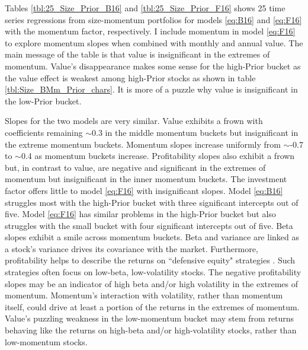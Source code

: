 
Tables \ref{tbl:25_Size_Prior_B16} and \ref{tbl:25_Size_Prior_F16} shows 25
time series regressions from size-momentum portfolios for models
\ref{eq:B16} and \ref{eq:F16} with the momentum factor, respectively.
I include momentum in
model \ref{eq:F16} to explore momentum slopes when combined with monthly and
annual value.
The main message of the table is that value is insignificant in the extremes
of momentum.
Value's disappearance makes some sense for the high-Prior bucket as the value
effect is weakest among high-Prior stocks as shown in table
\ref{tbl:Size_BMm_Prior_chars}.
It is more of a puzzle why value is insignificant in the low-Prior bucket.

Slopes for the two models are very similar.
Value exhibits a frown with coefficients remaining $\sim$0.3 in the middle
momentum buckets but insignificant in the extreme momentum buckets.
Momentum slopes increase uniformly from $\sim$-0.7 to $\sim$0.4 as momentum
buckets increase.
Profitability slopes also exhibit a frown but, in contrast to value, are
negative and significant in the extremes of momentum but insignificant
in the inner momentum buckets.
The investment factor offers little to model \ref{eq:F16} with insignificant
slopes.
Model \ref{eq:B16} struggles most with the high-Prior bucket with three
significant intercepts out of five.
Model \ref{eq:F16} has similar problems in the high-Prior bucket but also
struggles with the small bucket with four significant intercepts out of five.
Beta slopes exhibit a smile across momentum buckets. Beta and variance are
linked as a stock's variance drives its covariance with the market.
Furthermore, profitability helps to describe the returns on ``defensive equity"
strategies \parencite{novy2014understanding}.
Such strategies often focus on low-beta, low-volatility stocks.
The negative profitability slopes may be an indicator of high beta and/or
high volatility in the extremes of momentum.
Momentum's interaction with volatility, rather than momentum itself, could
drive at least a portion of the returns in the extremes of momentum.
Value's puzzling weakness in the low-momentum bucket may stem from returns
behaving like the returns on high-beta and/or high-volatility stocks,
rather than low-momentum stocks.

